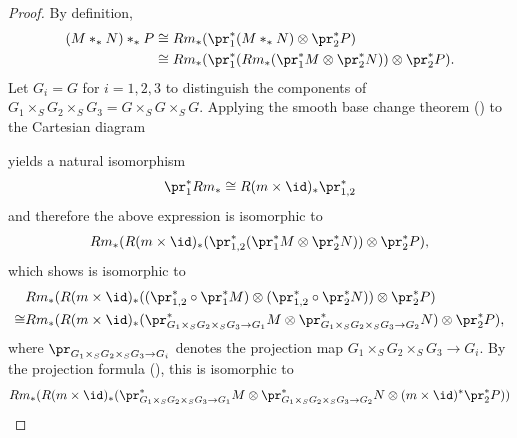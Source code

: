\begin{proof}
    By definition,
    \begin{align}
        (M *_* N) *_* P  \nonumber
        &\cong Rm_* ( \pr_1^* (M *_* N) \otimes \pr_2^* P) \nonumber \\
        &\cong Rm_* ( \pr_1^* (Rm_* (\pr_1^* M \otimes \pr_2^* N)) \otimes \pr_2^* P).
    \end{align}
    Let $G_i = G$ for $i = 1,2,3$ to distinguish the components of $G_1 \times_S G_2 \times_S G_3 = G \times_S G \times_S G$. Applying the smooth base change theorem () to the Cartesian diagram
    \begin{center}
    \end{center}
    yields a natural isomorphism
    $$\pr_1^* Rm_* \cong R(m \times \id)_* \pr_{1,2}^*$$
    and therefore the above expression is isomorphic to
    $$Rm_* (  R(m \times \id)_* (\pr_{1,2}^* (\pr_1^* M \otimes \pr_2^* N)) \otimes \pr_2^* P),$$
    which  shows is isomorphic to
    \begin{align*}
        & Rm_* (  R(m \times \id)_* ((\pr_{1,2}^* \circ \pr_1^* M) \otimes (\pr_{1,2}^* \circ \pr_2^* N)) \otimes \pr_2^* P) \\
        \cong & Rm_* (  R(m \times \id)_* ( \pr_{G_1 \times_S G_2 \times_S G_3 \to G_1}^* M \otimes \pr_{G_1 \times_S G_2 \times_S G_3 \to G_2}^* N ) \otimes \pr_2^* P),
    \end{align*}
    where $\pr_{G_1 \times_S G_2 \times_S G_3 \to G_i}$ denotes the projection map $G_1 \times_S G_2 \times_S G_3 \to G_i$. By the projection formula (), this is isomorphic to
    \begin{align*}
        & Rm_* (  R(m \times \id)_* ( \pr_{G_1 \times_S G_2 \times_S G_3 \to G_1}^* M \otimes \pr_{G_1 \times_S G_2 \times_S G_3 \to G_2}^* N  \otimes (m \times \id)^* \pr_2^* P)) \\

\end{align*}
\end{proof}
